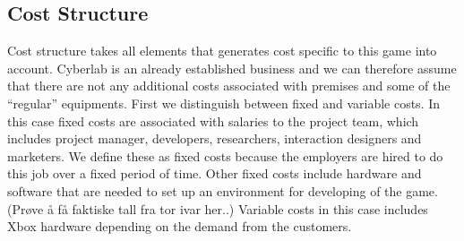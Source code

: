 \subsection{Cost Structure}
Cost structure takes all elements that generates cost specific to this game into account. Cyberlab is an already established business and we can therefore assume that there are not any additional costs associated with premises and some of the “regular” equipments. First we distinguish between fixed and variable costs. In this case fixed costs are associated with salaries to the project team, which includes project manager, developers, researchers, interaction designers and marketers. We define these as fixed costs because the employers are hired to do this job over a fixed period of time. Other fixed costs include hardware and software that are needed to set up an environment for developing of the game. (Prøve å få faktiske tall fra tor ivar her..) Variable costs in this case includes Xbox hardware depending on the demand from the customers. 


